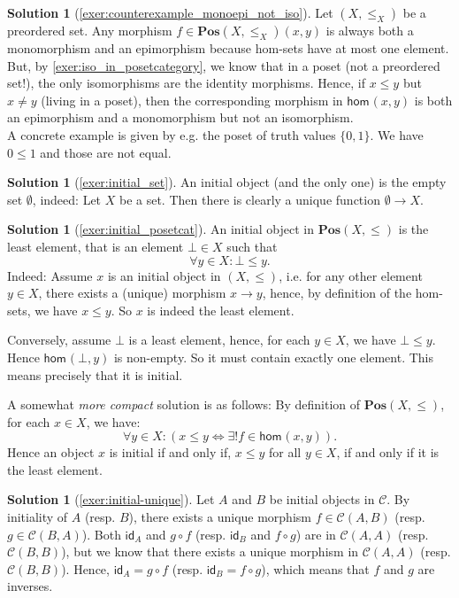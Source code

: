 \documentclass[a4paper,11pt, oneside,titlepage=false]{scrbook}
\theoremstyle{plain}
\theoremstyle{definition}
\newtheorem{solution}[thm]{Solution}
\newcommand{\cfont}[1]{\ensuremath{\mathsf{#1}}}
\newcommand{\Cat}[1]{\mathcal{#1}}
\newcommand{\CC}{\Cat{C}}
\newcommand{\Catb}[1]{\mathbf{#1}}
\newcommand{\POS}{\Catb{Pos}}
\newcommand{\Hom}[3][]{\cfont{hom}_{#1}(#2,#3)}
\newcommand{\CHom}[3]{{#1}(#2,#3)}
\newcommand{\Id}[1][]{\cfont{id}_{#1}}
\newcommand{\co}[2]{\ensuremath{#2 \circ #1}}
\begin{document}
\begin{solution}[\cref{exer:counterexample_monoepi_not_iso}]\label{sol:counterexample_monoepi_not_iso}
Let $(X,\leq_X)$ be a preordered set. Any morphism $f \in \POS(X,\leq_X)(x,y)$ is always both a monomorphism and an epimorphism because hom-sets have at most one element. But, by \cref{exer:iso_in_posetcategory}, we know that in a poset (not a preordered set!), the only isomorphisms are the identity morphisms. Hence, if $x\leq y$ but $x\not=y$ (living in a poset), then the corresponding morphism in $\Hom{x}{y}$ is both an epimorphism and a monomorphism but not an isomorphism.\\
A concrete example is given by e.g. the poset of truth values $\{0, 1\}$. We have $0\leq 1$ and those are not equal.
\end{solution}

\begin{solution}[\cref{exer:initial_set}] \label{sol:initial_set}
An initial object (and the only one) is the empty set $\emptyset$, indeed: Let $X$ be a set. Then there is clearly a unique function $\emptyset\to X$.
\end{solution}

\begin{solution}[\cref{exer:initial_posetcat}]\label{sol:initial_posetcat}
An initial object in $\POS(X,\leq)$ is the least element, that is an element $\bot\in X$ such that
\begin{equation}
\forall y\in X: \bot \leq y.
\end{equation}
Indeed: Assume $x$ is an initial object in $(X,\leq)$, i.e. for any other element $y\in X$, there exists a (unique) morphism $x\to y$, hence, by definition of the hom-sets, we have $x\leq y$. So $x$ is indeed the least element.

Conversely, assume $\bot$ is a least element, hence, for each $y\in X$, we have $\bot\leq y$. Hence $\Hom{\bot}{y}$ is non-empty. So it must contain exactly one element. This means precisely that it is initial.


A somewhat \textit{more compact} solution is as follows: By definition of $\POS(X,\leq)$, for each $x\in X$, we have:
\[
\forall y\in X: \left(x\leq y \iff \exists! f\in \Hom{x}{y}\right).
\]
Hence an object $x$ is initial if and only if, $x\leq y$ for all $y\in X$, if and only if it is the least element.
\end{solution}

\begin{solution}[\cref{exer:initial-unique}]\label{sol:initial-unique}
Let $A$ and $B$ be initial objects in $\CC$. By initiality of $A$ (resp. $B$), there exists a unique morphism $f \in \CHom{\CC}{A}{B}$ (resp. $g \in \CHom{\CC}{B}{A}$). Both $\Id[A]$ and $\co{f}{g}$ (resp. $\Id[B]$ and $\co{g}{f}$) are in $\CHom{\CC}{A}{A}$ (resp. $\CHom{\CC}{B}{B}$), but we know that there exists a unique morphism in $\CHom{\CC}{A}{A}$ (resp. $\CHom{\CC}{B}{B}$). Hence, $\Id[A] = \co{f}{g}$ (resp. $\Id[B] = \co{g}{f}$), which means that $f$ and $g$ are inverses.
\end{solution}
\end{document}
